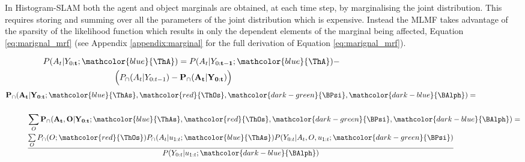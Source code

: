\begin{center}
%
\end{center}

In Histogram-SLAM both the agent and object marginals are obtained, at each time step, by marginalising the joint distribution.
This requires storing and summing over all the parameters of the joint distribution which is expensive.
Instead the MLMF takes advantage of the sparsity of the likelihood function which results in only the dependent elements of the marginal being affected, 
Equation \ref{eq:marignal_mrf} (see Appendix \ref{appendix:marginal} for the full derivation of Equation \ref{eq:marignal_mrf}). 

\begin{align}
 &P(A_t|Y_{0:\mathbf{t}};\mathcolor{blue}{\ThA}) = P(A_t|Y_{0:\mathbf{t-1}};\mathcolor{blue}{\ThA}) - \hspace*{6cm} \nonumber \\
 &\hspace*{3cm}  \Big(P_{\cap}(A_t|Y_{0:t-1}) -  \mathbf{P_{\cap}(A_t|Y_{0:t}})  \Big)  \label{eq:marignal_mrf} 
\end{align}
\begin{align}
 &\mathbf{P_{\cap}(A_t|Y_{0:t}};\mathcolor{blue}{\ThAs},\mathcolor{red}{\ThOs},\mathcolor{dark-green}{\BPsi},\mathcolor{dark-blue}{\BAlph})  = \nonumber \\[0.5cm]
 &\hspace*{1cm} \sum\limits_{O} \mathbf{P_{\cap}(A_t,O|Y_{0:t}};\mathcolor{blue}{\ThAs},\mathcolor{red}{\ThOs},\mathcolor{dark-green}{\BPsi},\mathcolor{dark-blue}{\BAlph}) = \nonumber \\
 &\hspace*{1cm} \frac{ \sum\limits_{O} P_{\cap}(O;\mathcolor{red}{\ThOs}) P_{\cap}(A_t|u_{1:t};\mathcolor{blue}{\ThAs})  P(Y_{0:t}|A_t,O,u_{1:t};\mathcolor{dark-green}{\BPsi})}{P(Y_{0:t}|u_{1:t};\mathcolor{dark-blue}{\BAlph})} \label{eq:marignal_mrf_2} 
\end{align}

